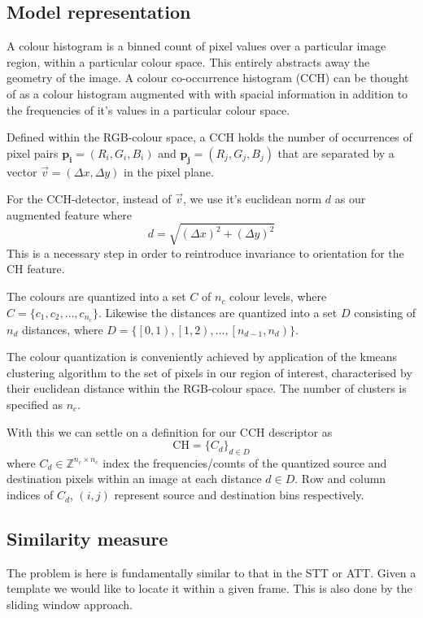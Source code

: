 \subsection{Model representation}
A colour histogram is a binned count of pixel values over a particular image
region, within a particular colour space. This entirely abstracts away the geometry of
the image.
A colour co-occurrence histogram (CCH) can be thought of as a colour histogram
augmented with with spacial information in addition to the frequencies of it's
values in a particular colour
space.

Defined within the RGB-colour space, a CCH holds the number of occurrences of
pixel pairs $\mathbf{p_i}=(R_i,G_i,B_i)$ and $\mathbf{p_j}=(R_j,G_j,B_j)$ that
are separated by a vector $\vec{v}=(\Delta{x}, \Delta{y})$ in the pixel plane.

For the CCH-detector, instead of $\vec{v}$, we use it's euclidean norm $d$ as our
augmented feature where 
\[d = \sqrt{{(\Delta{x})}^2 + {(\Delta{y})}^2}\] 
This is a necessary step in order to reintroduce invariance to orientation for
the CH feature. 

The colours are quantized into a set $C$ of $n_c$ colour levels, where 
$C = \{c_1,c_2,\dots,c_{n_c}\}$. Likewise the distances are quantized into
a set $D$ consisting of $n_d$ distances, where $ D = \{ \left[ 0,1
\right), \left[ 1,2 \right), \dots , \left[ n_{d-1}, n_{d} \right) \}$.

The colour quantization is conveniently achieved by application of the kmeans clustering
algorithm to the set of pixels in our region of interest, characterised by their
euclidean distance within the RGB-colour space. The number of clusters is
specified as $n_c$. 

With this we can settle on a definition for our CCH descriptor as
\[\text{CH} = {\{C_d\}}_{d \in D} \] 
where $C_d \in \mathbb{Z}^{n_c \times n_c}$ index the
frequencies/counts of the quantized source and destination pixels within an
image at each distance $d \in D$. Row and column indices of
$C_d$, $(i,j)$ represent source and destination bins respectively.  

\subsection{Similarity measure}\label{theoretical_framework_intersection}
The problem is here is fundamentally similar to that in the STT or ATT\@. 
Given a template we would like to locate it within a given frame.
This is also done by the sliding window approach.

